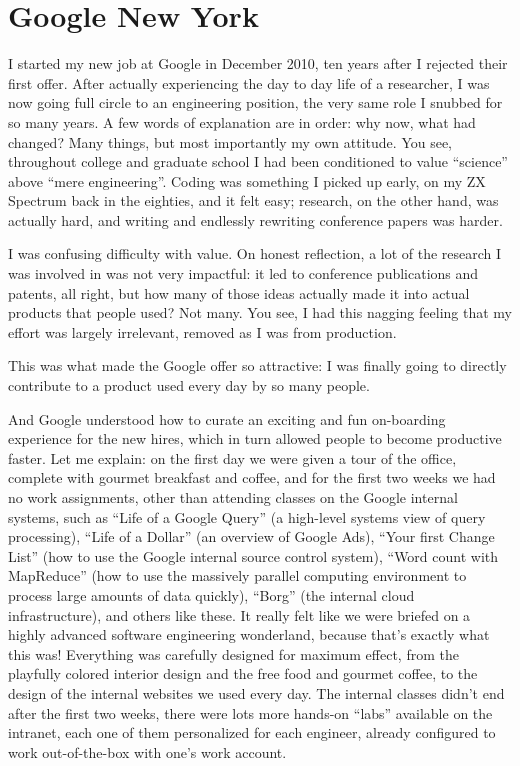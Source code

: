 \documentclass[12pt]{book}
\begin{document}
\section{Google New York}

I started my new job at Google in December 2010, ten years after I
rejected their first offer. After actually experiencing the day to day
life of a researcher, I was now going full circle to an engineering
position, the very same role I snubbed for so many years. A few words of
explanation are in order: why now, what had changed? Many things, but
most importantly my own attitude. You see, throughout college and
graduate school I had been conditioned to value ``science'' above ``mere
engineering''. Coding was something I picked up early, on my ZX Spectrum
back in the eighties, and it felt easy; research, on the other hand, was
actually hard, and writing and endlessly rewriting conference papers was
harder.

I was confusing difficulty with value. On honest reflection, a lot of
the research I was involved in was not very impactful: it led to
conference publications and patents, all right, but how many of those
ideas actually made it into actual products that people used? Not many.
You see, I had this nagging feeling that my effort was largely
irrelevant, removed as I was from production.

This was what made the Google offer so attractive: I was finally going
to directly contribute to a product used every day by so many people.

And Google understood how to curate an exciting and fun on-boarding
experience for the new hires, which in turn allowed people to become
productive faster. Let me explain: on the first day we were given a tour
of the office, complete with gourmet breakfast and coffee, and for the
first two weeks we had no work assignments, other than attending classes
on the Google internal systems, such as ``Life of a Google Query'' (a
high-level systems view of query processing), ``Life of a Dollar'' (an
overview of Google Ads), ``Your first Change List'' (how to use the
Google internal source control system), ``Word count with MapReduce''
(how to use the massively parallel computing environment to process
large amounts of data quickly), ``Borg'' (the internal cloud
infrastructure), and others like these. It really felt like we were
briefed on a highly advanced software engineering wonderland, because
that's exactly what this was! Everything was carefully designed for
maximum effect, from the playfully colored interior design and the free
food and gourmet coffee, to the design of the internal websites we used
every day. The internal classes didn't end after the first two weeks,
there were lots more hands-on ``labs'' available on the intranet, each
one of them personalized for each engineer, already configured to work
out-of-the-box with one's work account.
\end{document}
